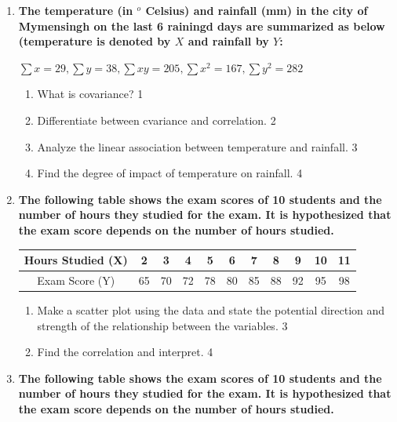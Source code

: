 \documentclass[a4paper,oneside]{book}
\begin{document}
 \begin{enumerate}
 
  \item
	  \textbf{The temperature (in $^o$ Celsius) and rainfall (mm) in the city of Mymensingh on the last 6 rainingd days are summarized as below (temperature is denoted by $X$ and rainfall by $Y$: } 
	  
	  \begin{center}
	  $\sum x = 29, \sum y = 38, \sum xy = 205, \sum x^2 = 167, \sum y^2 = 282$
  \end{center}
  \begin{enumerate}
    \item
	What is covariance? \hfill 1
    \item
	Differentiate between cvariance and correlation. \hfill 2
    \item  
	Analyze the linear association between temperature and rainfall. \hfill 3
    \item
	Find the degree of impact of temperature on rainfall. \hfill 4
  \end{enumerate}
 
   \item
	  \textbf{The following table shows the exam scores of 10 students and the number of hours they studied for the exam. It is hypothesized that the exam score depends on the number of hours studied.} 
	  
\begin{table}[h!]
\centering
\begin{tabular}{c|c|c|c|c|c|c|c|c|c|c}
Hours Studied (X) & 2 & 3 & 4 & 5 & 6 & 7 & 8 & 9 & 10 & 11 \\ \hline
Exam Score (Y) & 65 & 70 & 72 & 78 & 80 & 85 & 88 & 92 & 95 & 98 \\
\end{tabular}
\end{table}

  \begin{enumerate}
    \item  
	Make a scatter plot using the data and state the potential direction and strength of the relationship between the variables. \hfill 3
    \item
	Find the correlation and interpret. \hfill 4
  \end{enumerate}
 
  \item
	  \textbf{The following table shows the exam scores of 10 students and the number of hours they studied for the exam. It is hypothesized that the exam score depends on the number of hours studied.} 
	  

\end{enumerate}
\end{document}
